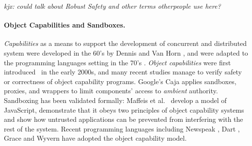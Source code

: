 \textit{kjx: could talk about Robust Safety and other terms
  otherpeople use here?}



\paragraph{Object Capabilities and Sandboxes.}
{{\em Capabilities} as a means to support the development of concurrent and distributed system  were developed in the 60's
by Dennis and Van Horn \cite{Dennis66}, and were adapted to the
programming languages setting in the 70's \cite{JamesMorris}. 
{\em Object capabilities} were first introduced~\cite{MillerPhD} in the early 2000s},
 and many recent %
studies manage
to verify  safety or correctness of object capability programs.
Google's Caja \cite{Caja} applies   sandboxes, proxies, and wrappers
 to limit components'
access to \textit{ambient} authority.
Sandboxing has been validated
formally: Maffeis et al.\ \cite{mmt-oakland10} develop a model of
JavaScript, demonstrate that it obeys two principles of
object capability systems
and show  how untrusted applications can be prevented from interfering with
the rest of the system. 
Recent programming languages %
\cite{CapJavaHayesAPLAS17,CapNetSocc17Eide,DOCaT14} including Newspeak
\cite{newspeak17}, Dart \cite{dart15}, Grace \cite{grace,graceClasses}
and Wyvern \cite{wyverncapabilities} have adopted the object
capability model.

  
